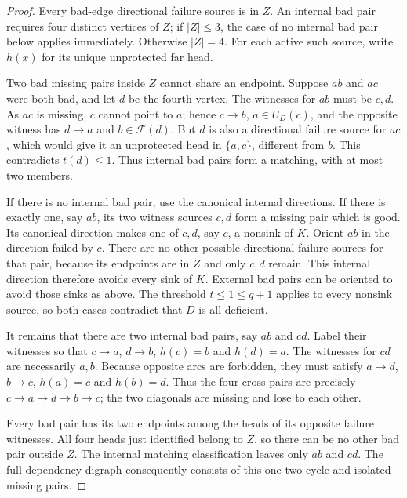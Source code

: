 \begin{proof}
Every bad-edge directional failure source is in $Z$.
An internal bad pair requires four distinct vertices of $Z$; if
$|Z|\le3$, the case of no internal bad pair below applies immediately.
Otherwise $|Z|=4$.
For each active such source, write $h(x)$ for its unique
unprotected far head.

Two bad missing pairs inside $Z$ cannot share an endpoint.
Suppose $ab$ and $ac$ were both bad, and let $d$ be the fourth vertex.
The witnesses for $ab$ must be $c,d$.
As $ac$ is missing, $c$ cannot point to $a$; hence $c\to b$,
$a\in U_D(c)$, and the opposite witness has $d\to a$ and
$b\in\mathcal F(d)$.
But $d$ is also a directional failure source for $ac$, which
would give it an unprotected head in $\{a,c\}$, different from $b$.
This contradicts $t(d)\le1$.
Thus internal bad pairs form a matching, with at most two members.

If there is no internal bad pair, use the canonical internal
directions.  If there is exactly one, say $ab$, its two witness
sources $c,d$ form a missing pair which is good.
Its canonical direction makes one of $c,d$, say $c$, a nonsink
of $K$.  Orient $ab$ in the direction failed by $c$.
There are no other possible directional failure sources for that
pair, because its endpoints are in $Z$ and only $c,d$ remain.
This internal direction therefore avoids every sink of $K$.
External bad pairs can be oriented to avoid those sinks as above.
The threshold $t\le1\le g+1$ applies to every nonsink source,
so both cases contradict that $D$ is all-deficient.

It remains that there are two internal bad pairs, say $ab$ and $cd$.
Label their witnesses so that $c\to a$, $d\to b$,
$h(c)=b$ and $h(d)=a$.
The witnesses for $cd$ are necessarily $a,b$.
Because opposite arcs are forbidden, they must satisfy
$a\to d$, $b\to c$, $h(a)=c$ and $h(b)=d$.
Thus the four cross pairs are precisely
$c\to a\to d\to b\to c$; the two diagonals are missing and
lose to each other.

Every bad pair has its two endpoints among the heads of its
opposite failure witnesses.  All four heads just identified
belong to $Z$, so there can be no other bad pair outside $Z$.
The internal matching classification leaves only $ab$ and $cd$.
The full dependency digraph consequently consists of this one
two-cycle and isolated missing pairs.
\end{proof}

